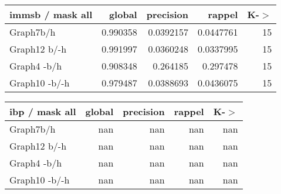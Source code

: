 \begin{table*} 
	\begin{minipage}[h]{0.45\linewidth} 
\begin{tabular}{lrrrr}
\hline
 immsb / mask all   &   global &   precision &    rappel &   K-\ensuremath{>} \\
\hline
 Graph7b/h          & 0.990358 &   0.0392157 & 0.0447761 &    15 \\
 Graph12 b/-h       & 0.991997 &   0.0360248 & 0.0337995 &    15 \\
 Graph4 -b/h        & 0.908348 &   0.264185  & 0.297478  &    15 \\
 Graph10 -b/-h      & 0.979487 &   0.0388693 & 0.0436075 &    15 \\
\hline
\end{tabular}
\end{minipage}
\hspace{0.5cm}
\begin{minipage}[h]{0.45\linewidth}
\begin{tabular}{lrrrr}
\hline
 ibp / mask all   &   global &   precision &   rappel &   K-\ensuremath{>} \\
\hline
 Graph7b/h        &      nan &         nan &      nan &   nan \\
 Graph12 b/-h     &      nan &         nan &      nan &   nan \\
 Graph4 -b/h      &      nan &         nan &      nan &   nan \\
 Graph10 -b/-h    &      nan &         nan &      nan &   nan \\
\hline
\end{tabular}
\end{minipage}
\end{table*}


